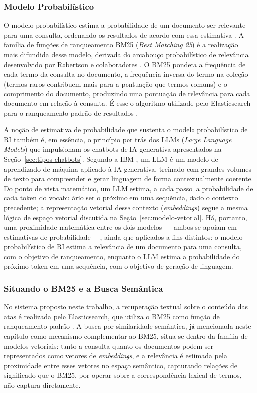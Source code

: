 \subsubsection{Modelo Probabilístico}
O modelo probabilístico estima a probabilidade de um documento ser relevante para uma consulta, ordenando os resultados de acordo com essa estimativa \cite{baezayates2010modern}. A família de funções de ranqueamento BM25 (\textit{Best Matching 25}) é a realização mais difundida desse modelo, derivada do arcabouço probabilístico de relevância desenvolvido por Robertson e colaboradores \cite{robertson2009bm25}. O BM25 pondera a frequência de cada termo da consulta no documento, a frequência inversa do termo na coleção (termos raros contribuem mais para a pontuação que termos comuns) e o comprimento do documento, produzindo uma pontuação de relevância para cada documento em relação à consulta. É esse o algoritmo utilizado pelo Elasticsearch para o ranqueamento padrão de resultados \cite{IBMElasticsearch}.

A noção de estimativa de probabilidade que sustenta o modelo probabilístico de RI também é, em essência, o princípio por trás dos LLMs (\textit{Large Language Models}) que impulsionam os chatbots de IA generativa apresentados na Seção~\ref{sec:tipos-chatbots}. Segundo a IBM \cite{IBMLLM}, um LLM é um modelo de aprendizado de máquina aplicado à IA generativa, treinado com grandes volumes de texto para compreender e gerar linguagem de forma contextualmente coerente. Do ponto de vista matemático, um LLM estima, a cada passo, a probabilidade de cada token do vocabulário ser o próximo em uma sequência, dado o contexto precedente; a representação vetorial desse contexto (\textit{embeddings}) segue a mesma lógica de espaço vetorial discutida na Seção~\ref{sec:modelo-vetorial}. Há, portanto, uma proximidade matemática entre os dois modelos — ambos se apoiam em estimativas de probabilidade —, ainda que aplicados a fins distintos: o modelo probabilístico de RI estima a relevância de um documento para uma consulta, com o objetivo de ranqueamento, enquanto o LLM estima a probabilidade do próximo token em uma sequência, com o objetivo de geração de linguagem.

\subsubsection{Situando o BM25 e a Busca Semântica}
No sistema proposto neste trabalho, a recuperação textual sobre o conteúdo das atas é realizada pelo Elasticsearch, que utiliza o BM25 como função de ranqueamento padrão \cite{IBMElasticsearch}. A busca por similaridade semântica, já mencionada neste capítulo como mecanismo complementar ao BM25, situa-se dentro da família de modelos vetoriais: tanto a consulta quanto os documentos podem ser representados como vetores de \textit{embeddings}, e a relevância é estimada pela proximidade entre esses vetores no espaço semântico, capturando relações de significado que o BM25, por operar sobre a correspondência lexical de termos, não captura diretamente.

